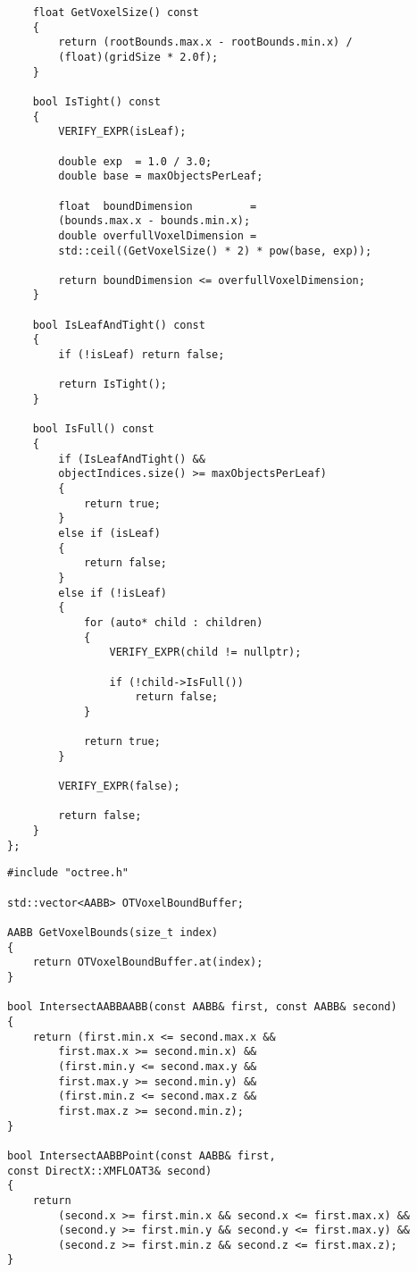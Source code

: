 \begin{lstlisting}
    float GetVoxelSize() const
    {
        return (rootBounds.max.x - rootBounds.min.x) / 
        (float)(gridSize * 2.0f);
    }

    bool IsTight() const
    {
        VERIFY_EXPR(isLeaf);

        double exp  = 1.0 / 3.0;
        double base = maxObjectsPerLeaf;

        float  boundDimension         = 
        (bounds.max.x - bounds.min.x);
        double overfullVoxelDimension = 
        std::ceil((GetVoxelSize() * 2) * pow(base, exp));

        return boundDimension <= overfullVoxelDimension;
    }

    bool IsLeafAndTight() const
    {
        if (!isLeaf) return false;

        return IsTight();
    }

    bool IsFull() const
    {
        if (IsLeafAndTight() && 
        objectIndices.size() >= maxObjectsPerLeaf)
        {
            return true;
        }
        else if (isLeaf)
        {
            return false;
        }
        else if (!isLeaf)
        {
            for (auto* child : children)
            {
                VERIFY_EXPR(child != nullptr);

                if (!child->IsFull())
                    return false;
            }

            return true;
        }

        VERIFY_EXPR(false);
 
        return false;
    }
};
\end{lstlisting}

\begin{lstlisting}
#include "octree.h"

std::vector<AABB> OTVoxelBoundBuffer;

AABB GetVoxelBounds(size_t index)
{
    return OTVoxelBoundBuffer.at(index);
}

bool IntersectAABBAABB(const AABB& first, const AABB& second)
{
    return (first.min.x <= second.max.x && 
        first.max.x >= second.min.x) &&
        (first.min.y <= second.max.y && 
        first.max.y >= second.min.y) &&
        (first.min.z <= second.max.z && 
        first.max.z >= second.min.z);
}

bool IntersectAABBPoint(const AABB& first, 
const DirectX::XMFLOAT3& second)
{
    return 
        (second.x >= first.min.x && second.x <= first.max.x) &&
        (second.y >= first.min.y && second.y <= first.max.y) &&
        (second.z >= first.min.z && second.z <= first.max.z);
}
\end{lstlisting}

